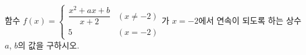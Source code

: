 함수 $f(x)=\begin{cases} \dfrac{x^2+ax+b}{x+2} & (x\ne -2) \\ 5 & (x=-2) \end{cases}$가 $x=-2$에서 연속이 되도록 하는 상수 $a$, $b$의 값을 구하시오.
